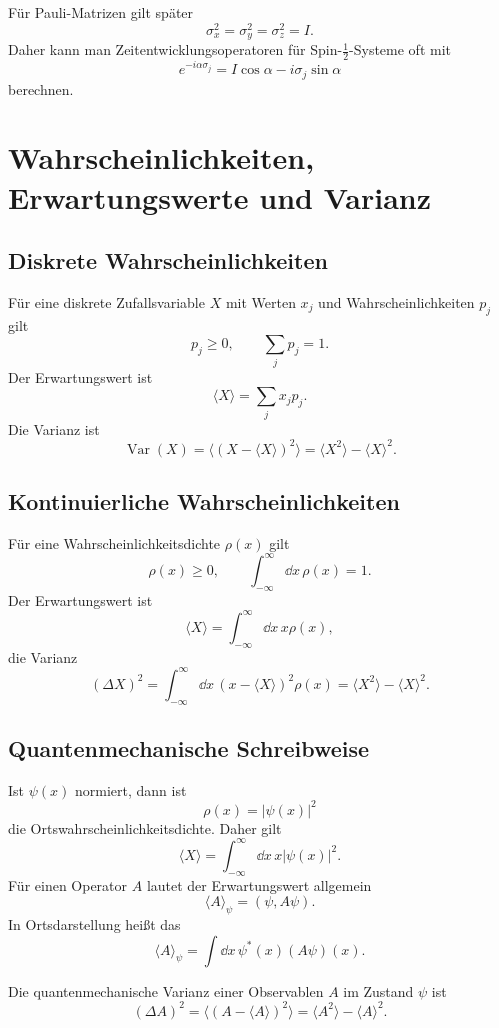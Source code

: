 \begin{examplebox}
Für Pauli-Matrizen gilt später
\[
    \sigma_x^2=\sigma_y^2=\sigma_z^2=I.
\]
Daher kann man Zeitentwicklungsoperatoren für Spin-$\frac12$-Systeme oft mit
\[
    e^{-i\alpha\sigma_j}=I\cos\alpha-i\sigma_j\sin\alpha
\]
berechnen.
\end{examplebox}

\section{Wahrscheinlichkeiten, Erwartungswerte und Varianz}

\subsection{Diskrete Wahrscheinlichkeiten}

Für eine diskrete Zufallsvariable $X$ mit Werten $x_j$ und Wahrscheinlichkeiten $p_j$ gilt
\[
    p_j\ge0,
    \qquad
    \sum_j p_j=1.
\]
Der Erwartungswert ist
\[
    \langle X\rangle=\sum_j x_jp_j.
\]
Die Varianz ist
\[
    \operatorname{Var}(X)=\langle (X-\langle X\rangle)^2\rangle
    =\langle X^2\rangle-\langle X\rangle^2.
\]

\subsection{Kontinuierliche Wahrscheinlichkeiten}

Für eine Wahrscheinlichkeitsdichte $\rho(x)$ gilt
\[
    \rho(x)\ge0,
    \qquad
    \int_{-\infty}^{\infty}\dd x\,\rho(x)=1.
\]
Der Erwartungswert ist
\[
    \langle X\rangle=\int_{-\infty}^{\infty}\dd x\,x\rho(x),
\]
die Varianz
\[
    (\Delta X)^2=\int_{-\infty}^{\infty}\dd x\,(x-\langle X\rangle)^2\rho(x)
    =\langle X^2\rangle-\langle X\rangle^2.
\]

\subsection{Quantenmechanische Schreibweise}

Ist $\psi(x)$ normiert, dann ist
\[
    \rho(x)=|\psi(x)|^2
\]
die Ortswahrscheinlichkeitsdichte. Daher gilt
\[
    \langle X\rangle=\int_{-\infty}^{\infty}\dd x\,x|\psi(x)|^2.
\]
Für einen Operator $A$ lautet der Erwartungswert allgemein
\[
    \langle A\rangle_\psi=(\psi,A\psi).
\]
In Ortsdarstellung heißt das
\[
    \langle A\rangle_\psi
    =\int\dd x\,\psi^*(x)(A\psi)(x).
\]

\begin{formulabox}
Die quantenmechanische Varianz einer Observablen $A$ im Zustand $\psi$ ist
\[
    (\Delta A)^2
    =\langle (A-\langle A\rangle)^2\rangle
    =\langle A^2\rangle-\langle A\rangle^2.
\]
\end{formulabox}


